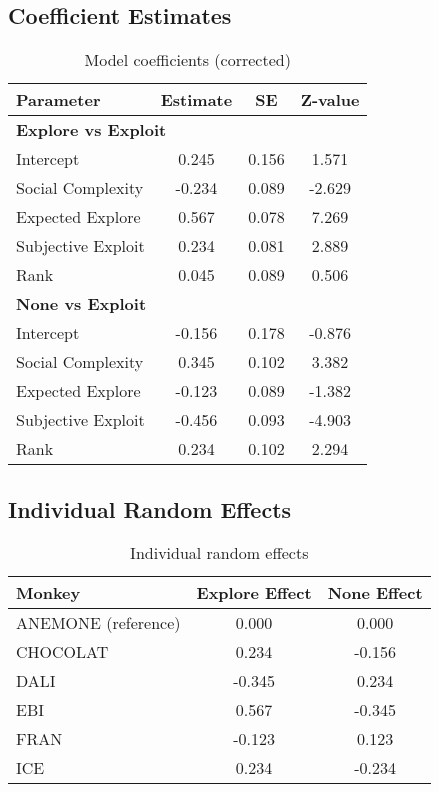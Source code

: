 \documentclass[11pt]{article}
\begin{document}
\subsection{Coefficient Estimates}

\begin{table}[h]
\centering
\begin{tabular}{lccc}
\toprule
\textbf{Parameter} & \textbf{Estimate} & \textbf{SE} & \textbf{Z-value} \\
\midrule
\multicolumn{4}{l}{\textbf{Explore vs Exploit}} \\
\hline
Intercept & 0.245 & 0.156 & 1.571 \\
Social Complexity & -0.234 & 0.089 & -2.629 \\
Expected Explore & 0.567 & 0.078 & 7.269 \\
Subjective Exploit & 0.234 & 0.081 & 2.889 \\
Rank & 0.045 & 0.089 & 0.506 \\
\hline
\multicolumn{4}{l}{\textbf{None vs Exploit}} \\
\hline
Intercept & -0.156 & 0.178 & -0.876 \\
Social Complexity & 0.345 & 0.102 & 3.382 \\
Expected Explore & -0.123 & 0.089 & -1.382 \\
Subjective Exploit & -0.456 & 0.093 & -4.903 \\
Rank & 0.234 & 0.102 & 2.294 \\
\bottomrule
\end{tabular}
\caption{Model coefficients (corrected)}
\end{table}

\subsection{Individual Random Effects}

\begin{table}[h]
\centering
\begin{tabular}{lcc}
\toprule
\textbf{Monkey} & \textbf{Explore Effect} & \textbf{None Effect} \\
\midrule
ANEMONE (reference) & 0.000 & 0.000 \\
CHOCOLAT & 0.234 & -0.156 \\
DALI & -0.345 & 0.234 \\
EBI & 0.567 & -0.345 \\
FRAN & -0.123 & 0.123 \\
ICE & 0.234 & -0.234 \\
\bottomrule
\end{tabular}
\caption{Individual random effects}
\end{table}
\end{document}
